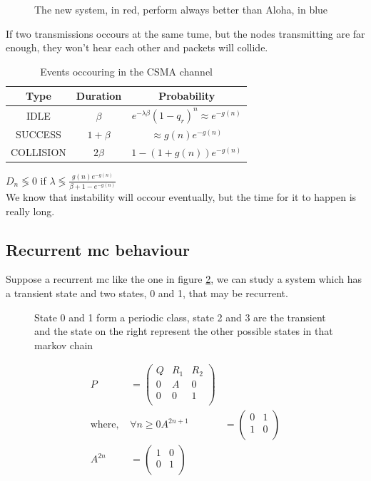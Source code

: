 \begin{figure} \centering
	
	\caption{The new system, in red, perform always better than Aloha, in blue}
	\label{}
\end{figure}
If two transmissions occours at the same tume, but the nodes transmitting are far enough, they won't hear each other and packets will collide.

\begin{table}[h!]
	\centering
	\begin{tabular}{|c|c|c|}
		\textbf{Type} & \textbf{Duration} & \textbf{Probability} \\ \hline
		IDLE & $\beta$ & $e^{-\lambda \beta} (1-q_r)^n \approx e^{-g(n)}$ \\
		SUCCESS & $1+\beta$ & $\approx g(n) e^{-g(n)}$ \\
		COLLISION & $2 \beta$ & $1-(1+g(n)) e^{-g(n)}$
	\end{tabular}
	\caption{Events occouring in the CSMA channel}
	\label{TAB:tx_prob}
\end{table}
$D_n \lessgtr 0 $ if $\lambda \lessgtr \frac{g(n) e^{-g(n)}}{\beta + 1 - e^{-g(n)}}$\\
We know that instability will occour eventually, but the time for it to happen is really long.

\subsection{Recurrent \gls{mc} behaviour}
Suppose a recurrent \gls{mc} like the one in figure \ref{fig:recurrMC}, we can study a system which has a transient state and two states, 0 and 1,
that may be recurrent.
\begin{figure}[h!]\centering
	
	\caption{ State 0 and 1 form a periodic class, state 2 and 3 are the transient
	and the state on the right represent the other possible states in that markov chain}
	\label{fig:recurrMC}
\end{figure}

\begin{equation}\begin{split}
	P&=\begin{pmatrix}
		Q & R_1 & R_2 \\
		0 & A  & 0 \\
		0 & 0  & 1 \\
	\end{pmatrix}\\
	\text{where, }&\forall n\ge 0
	A^{2n+1}&=\begin{pmatrix}
		0 & 1 \\
		1 & 0 \\
	\end{pmatrix}\\
	A^{2n}&=\begin{pmatrix}
		1 & 0 \\
		0 & 1 \\
	\end{pmatrix}\\
\end{split}\end{equation}

